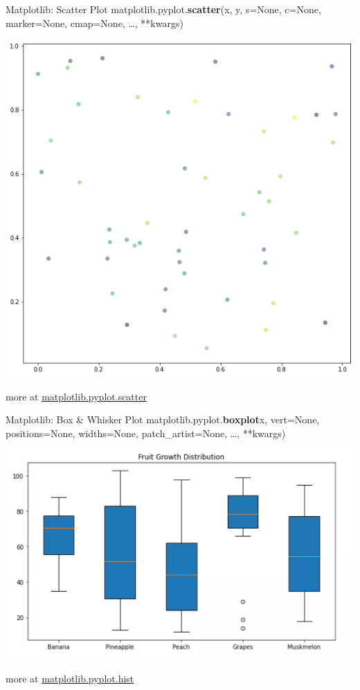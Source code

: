 \documentclass{beamer}
\begin{document}
    \begin{frame}[fragile]{Matplotlib: Scatter Plot}
        matplotlib.pyplot.\textbf{scatter}(x, y, s=None, c=None, marker=None, cmap=None, \dots, **kwargs)\\
        \begin{center}
            \includegraphics[width=\textwidth,height=0.6\textheight,keepaspectratio]{figures/Scatter.png}\\
        \end{center}
        more at \href{https://matplotlib.org/stable/api/_as_gen/matplotlib.pyplot.scatter.html}{matplotlib.pyplot.scatter}
    \end{frame}
    \begin{frame}[fragile]{Matplotlib: Box \& Whisker Plot}
        matplotlib.pyplot.\textbf{boxplot}x, vert=None, positions=None, widths=None, patch_artist=None, \dots, **kwargs)\\
        \begin{center}
            \includegraphics[width=\textwidth,height=0.6\textheight,keepaspectratio]{figures/boxplot.png}\\
        \end{center}
        more at \href{https://matplotlib.org/stable/api/_as_gen/matplotlib.pyplot.hist.html}{matplotlib.pyplot.hist}
    \end{frame}
\end{document}
